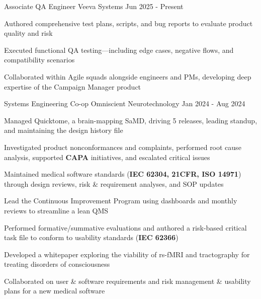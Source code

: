 \documentclass[11pt, a4paper]{russell}
\begin{document}
\begin{cventries}
\cventry
  {Associate QA Engineer} %
  {Veeva Systems} %
  {} %
  {Jun 2025 - Present} %
  {
    \begin{cvitems}
        \item {Authored comprehensive test plans, scripts, and bug reports to evaluate product quality and risk}
        \item {Executed  functional QA testing—including edge cases, negative flows, and compatibility scenarios}
        \item {Collaborated within Agile squads alongside engineers and PMs, developing deep expertise of the Campaign Manager product}
    \end{cvitems}
  }
\cventry
  {Systems Engineering Co-op} %
  {Omniscient Neurotechnology} %
  {} %
  {Jan 2024 - Aug 2024} %
  {
    \begin{cvitems}
        \item {Managed Quicktome, a brain-mapping SaMD, driving 5 releases, leading standup, and maintaining the design history file}
        \item {Investigated product nonconformances and complaints, performed root cause analysis, supported \textbf{CAPA} initiatives, and escalated critical issues}
        \item {Maintained medical software standards (\textbf{IEC 62304, 21CFR, ISO 14971}) through design reviews, risk \& requirement analyses, and SOP updates}
        \item {Lead the Continuous Improvement Program using dashboards and monthly reviews to streamline a lean QMS}
        \item {Performed formative/summative evaluations and authored a risk-based critical task file to conform to usability standards (\textbf{IEC 62366})}
        \item {Developed a whitepaper exploring the viability of rs-fMRI and tractography for treating disorders of consciousness}
        \item {Collaborated on user \& software requirements and risk management \& usability plans for a new medical software}
    \end{cvitems}
  }


\end{cventries}
\end{document}
